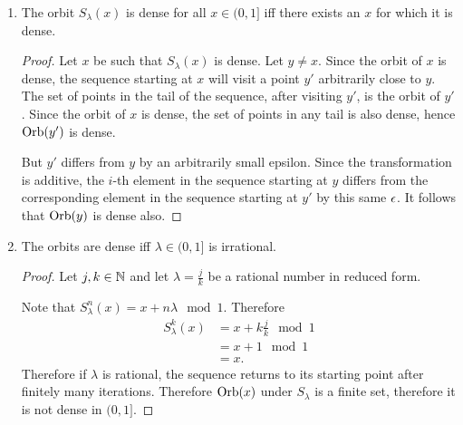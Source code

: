 \begin{enumerate}[label=(5.\arabic*)]

\item
  \begin{claim*}
    The orbit $S_{\lambda}(x)$ is dense for all $x \in (0, 1]$ iff there exists an $x$ for which it is dense.
  \end{claim*}
  \begin{proof}
    Let $x$ be such that $S_\lambda(x)$ is dense. Let $y \neq x$. Since the orbit of $x$ is dense, the sequence
    starting at $x$ will visit a point $y'$ arbitrarily close to $y$. The set of points in the tail of the
    sequence, after visiting $y'$, is the orbit of $y'$. Since the orbit of $x$ is dense, the set of points in
    any tail is also dense, hence $\text{Orb}(y')$ is dense.

    But $y'$ differs from $y$ by an arbitrarily small epsilon. Since the transformation is additive, the $i$-th
    element in the sequence starting at $y$ differs from the corresponding element in the sequence starting
    at $y'$ by this same $\epsilon$. It follows that $\text{Orb}(y)$ is dense also.
  \end{proof}

\item
  \begin{claim*}
    The orbits are dense iff $\lambda \in (0, 1]$ is irrational.
  \end{claim*}
  \begin{proof}
    Let $j, k \in \mathbb{N}$ and let $\lambda = \frac{j}{k}$ be a rational number in reduced form.

    Note that $S^n_\lambda(x) = x + n\lambda \mod 1$. Therefore
    \begin{align*}
      S^k_\lambda(x)
      &= x + k\frac{j}{k} \mod 1 \\
      &= x + 1 \mod 1 \\
      &= x.
    \end{align*}
    Therefore if $\lambda$ is rational, the sequence returns to its starting point after finitely many
    iterations. Therefore $\text{Orb}(x)$ under $S_\lambda$ is a finite set, therefore it is not dense in $(0, 1]$.


\end{proof}
\end{enumerate}
